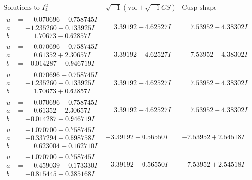 \documentclass[1p]{elsarticle_modified}
\theoremstyle{definition}
\newcommand{\I}{\sqrt{-1}}
\begin{document}
$$\begin{array}{c|c|c}  
\text{Solutions to }I^u_{4}& \I (\text{vol} + \sqrt{-1}CS) & \text{Cusp shape}\\
 \hline 
\begin{aligned}
u &= \phantom{-}0.070696 + 0.758745 I \\
a &= -1.235260 - 0.133925 I \\
b &= \phantom{-}1.70673 - 0.62857 I\end{aligned}
 & \phantom{-}3.39192 + 4.62527 I & \phantom{-}7.53952 - 4.38302 I \\ \hline\begin{aligned}
u &= \phantom{-}0.070696 + 0.758745 I \\
a &= \phantom{-}0.61352 + 2.30657 I \\
b &= -0.014287 + 0.946719 I\end{aligned}
 & \phantom{-}3.39192 + 4.62527 I & \phantom{-}7.53952 - 4.38302 I \\ \hline\begin{aligned}
u &= \phantom{-}0.070696 - 0.758745 I \\
a &= -1.235260 + 0.133925 I \\
b &= \phantom{-}1.70673 + 0.62857 I\end{aligned}
 & \phantom{-}3.39192 - 4.62527 I & \phantom{-}7.53952 + 4.38302 I \\ \hline\begin{aligned}
u &= \phantom{-}0.070696 - 0.758745 I \\
a &= \phantom{-}0.61352 - 2.30657 I \\
b &= -0.014287 - 0.946719 I\end{aligned}
 & \phantom{-}3.39192 - 4.62527 I & \phantom{-}7.53952 + 4.38302 I \\ \hline\begin{aligned}
u &= -1.070700 + 0.758745 I \\
a &= -0.337294 - 0.598758 I \\
b &= \phantom{-}0.623004 - 0.162710 I\end{aligned}
 & -3.39192 + 0.56550 I & -7.53952 + 2.54518 I \\ \hline\begin{aligned}
u &= -1.070700 + 0.758745 I \\
a &= \phantom{-}0.459039 + 0.173330 I \\
b &= -0.815445 - 0.385168 I\end{aligned}
 & -3.39192 + 0.56550 I & -7.53952 + 2.54518 I \\ \hline\begin{aligned}

\end{aligned}
\end{array}$$
\end{document}
